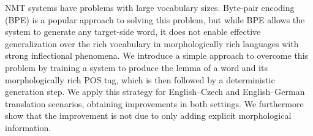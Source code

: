NMT systems have problems with large vocabulary sizes. Byte-pair encoding (BPE) is a popular approach to solving this problem, but while BPE allows the system to generate any target-side word, it does not enable effective generalization over the rich vocabulary in morphologically rich languages with strong inflectional phenomena. We introduce a simple approach to overcome this problem by training a system to produce the lemma of a word and its morphologically rich POS tag, which is then followed by a deterministic generation step. We apply this strategy for English--Czech and English--German translation scenarios, obtaining improvements in both settings. We furthermore show that the improvement is not due to only adding explicit morphological information.
